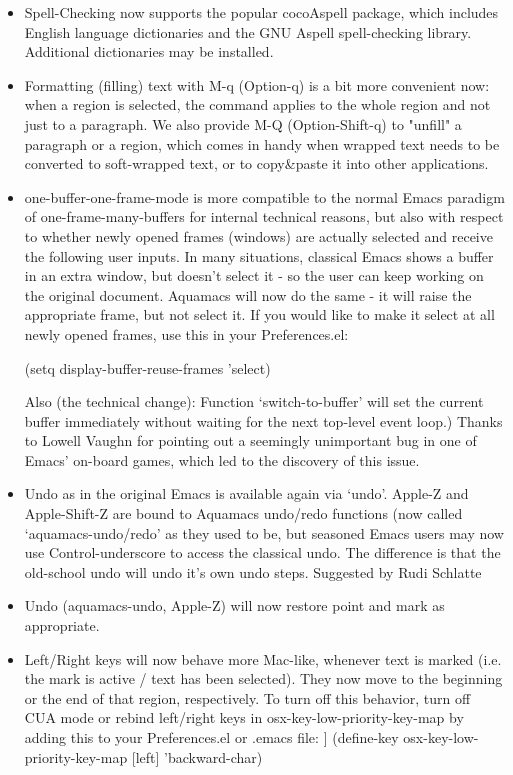 \begin{itemize}
\item Spell-Checking now supports the popular cocoAspell package,
	which includes English language dictionaries and the GNU Aspell
	spell-checking library. Additional dictionaries may be installed.
	
\item Formatting (filling) text with M-q (Option-q) is a bit more
	convenient now: when a region is selected, the command applies to
	the whole region and not just to a paragraph.
	We also provide M-Q (Option-Shift-q) to "unfill" a paragraph or a
	region, which comes in handy when wrapped text needs to be
	converted to soft-wrapped text, or to copy\&paste it into other applications.
	
\item one-buffer-one-frame-mode is more compatible to the normal Emacs
	paradigm of one-frame-many-buffers for internal technical
	reasons, but also with respect to whether newly opened frames
	(windows) are actually selected and receive the following user
	inputs. In many situations, classical Emacs shows a buffer in an
	extra window, but doesn't select it - so the user can keep
	working on the original document. Aquamacs will now do the same -
	it will raise the appropriate frame, but not select it. If you
	would like to make it select at all newly opened frames, use this
	in your Preferences.el:

	(setq display-buffer-reuse-frames 'select)

	Also (the technical change): Function `switch-to-buffer' will set
	the current buffer immediately without waiting for the next
	top-level event loop.)  Thanks to Lowell Vaughn for pointing out a
	seemingly unimportant bug in one of Emacs' on-board games, which
	led to the discovery of this issue.

      \item Undo as in the original Emacs is available again via
        `undo'. Apple-Z and Apple-Shift-Z are bound to Aquamacs
        undo/redo functions (now called `aquamacs-undo/redo' as they
        used to be, but seasoned Emacs users may now use
        Control-underscore to access the classical undo. The
        difference is that the old-school undo will undo it's own undo
        steps.  Suggested by Rudi Schlatte
	
\item Undo (aquamacs-undo, Apple-Z) will now restore point and mark as
	appropriate.

      \item Left/Right keys will now behave more Mac-like, whenever text is         marked (i.e. the mark is active / text has been selected). They now         move to the beginning or the end of that region, respectively. To turn off this behavior, turn off CUA mode or rebind  left/right keys in osx-key-low-priority-key-map by adding this to your Preferences.el or .emacs file: 
]
(define-key osx-key-low-priority-key-map [left] 'backward-char)


\end{itemize}
